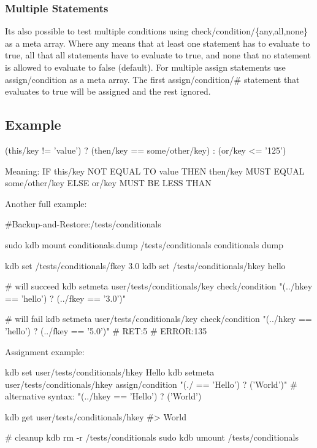 \subsubsection*{Multiple Statements}

It\textquotesingle{}s also possible to test multiple conditions using {\ttfamily check/condition/\{any,all,none\}} as a meta array. Where {\ttfamily any} means that at least one statement has to evaluate to true, {\ttfamily all} that all statements have to evaluate to true, and {\ttfamily none} that no statement is allowed to evaluate to false (default). For multiple assign statements use {\ttfamily assign/condition} as a meta array. The first {\ttfamily assign/condition/\#} statement that evaluates to true will be assigned and the rest ignored.

\subsection*{Example}

\begin{DoxyVerb}(this/key  != 'value') ? (then/key == some/other/key) : (or/key <= '125')
\end{DoxyVerb}


Meaning\+: IF {\ttfamily this/key} N\+OT E\+Q\+U\+AL TO {\ttfamily \textquotesingle{}value\textquotesingle{}} T\+H\+EN {\ttfamily then/key} M\+U\+ST E\+Q\+U\+AL {\ttfamily some/other/key} E\+L\+SE {\ttfamily or/key} M\+U\+ST BE L\+E\+SS T\+H\+AN {}

Another full example\+:


\begin{DoxyCode}
#Backup-and-Restore:/tests/conditionals

sudo kdb mount conditionals.dump /tests/conditionals conditionals dump

kdb set /tests/conditionals/fkey 3.0
kdb set /tests/conditionals/hkey hello

# will succeed
kdb setmeta user/tests/conditionals/key check/condition "(../hkey == 'hello') ? (../fkey == '3.0')"

# will fail
kdb setmeta user/tests/conditionals/key check/condition "(../hkey == 'hello') ? (../fkey == '5.0')"
# RET:5
# ERROR:135
\end{DoxyCode}


Assignment example\+:


\begin{DoxyCode}
kdb set user/tests/conditionals/hkey Hello
kdb setmeta user/tests/conditionals/hkey assign/condition "(./ == 'Hello') ? ('World')"
# alternative syntax: "(../hkey == 'Hello') ? ('World')

kdb get user/tests/conditionals/hkey
#> World

# cleanup
kdb rm -r /tests/conditionals
sudo kdb umount /tests/conditionals
\end{DoxyCode}


